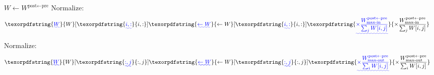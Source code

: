\documentclass{article}
\providecommand{\DIFaddtex}[1]{{\protect\color{blue}\uwave{#1}}} %
\providecommand{\DIFaddbegin}{} %
\providecommand{\DIFaddend}{} %
\providecommand{\DIFadd}[1]{\texorpdfstring{\DIFaddtex{#1}}{#1}} %
\begin{document}
\begin{algorithm}
\caption[]{Homeostasis}\label{alg:homeostasis}
\begin{algorithmic}[1]
\State $W \gets W^{\textrm{post}\leftarrow\textrm{pre}}$
         \DIFaddbegin {}
            \DIFaddend \State Normalize:
                 \DIFaddbegin \[
                \DIFadd{W}[\DIFadd{i,:}] \DIFadd{\gets W}[\DIFadd{i,:}] 
                \DIFadd{\times
                \frac{W^{\textrm{post}\leftarrow\textrm{pre}}_\textrm{max-in}}{\sum_j W[i,j]}
                }\]\DIFaddend 
        \EndIf
    \EndFor
         \DIFaddbegin {}
            \DIFaddend \State Normalize:
                 \DIFaddbegin \[
                \DIFadd{W}[\DIFadd{:,j}] \DIFadd{\gets W}[\DIFadd{:,j}] 
                \DIFadd{\times
                \frac{W^{\textrm{post}\leftarrow\textrm{pre}}_\text{max-out}}{\sum_i W[i,j]}
                }\]\DIFaddend 
        \EndIf
    \EndFor
\EndFunction
\end{algorithmic}
\end{algorithm}
\end{document}
